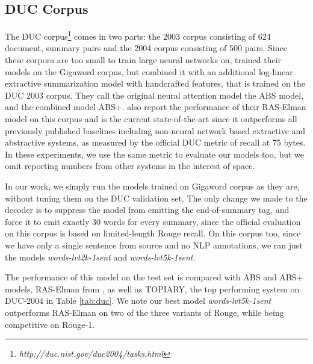\subsection{DUC Corpus}

The DUC corpus\footnote{{\it http://duc.nist.gov/duc2004/tasks.html}} comes in two parts: the 2003 corpus consisting of 624 document, summary pairs and the 2004 corpus consisting of 500 pairs. Since these corpora are too small to train large neural networks on,  trained their models on the Gigaword corpus, but combined it with an additional log-linear extractive summarization model with handcrafted features, that is trained on the DUC 2003 corpus. They call the original neural attention model the ABS model, and the combined model ABS+.  also report the performance of their RAS-Elman model on this corpus and is the current state-of-the-art since it outperforms all previously published baselines including non-neural network based extractive and abstractive systems, as measured by the official DUC metric of recall at 75 bytes. In these experiments, we use the same metric to evaluate our models too, but we omit reporting numbers from other systems in the interest of space.

In our work, we simply run the models trained on Gigaword corpus as they are, without tuning them on the DUC validation set. The only change we made to the decoder is to suppress the model from emitting the end-of-summary tag, and force it to emit exactly 30 words for every summary, since the official evaluation on this corpus is based on limited-length Rouge recall. On this corpus too, since we have only a single sentence from source and no NLP annotations, we ran just the models {\it words-lvt2k-1sent} and {\it words-lvt5k-1sent}.

The performance of this model on the test set is compared with ABS and ABS+ models, RAS-Elman from \cite{chopra}, as well as TOPIARY, the top performing system on DUC-2004 in Table \ref{tab:duc}. We note our best model {\it words-lvt5k-1sent} outperforms RAS-Elman on two of the three variants of Rouge, while being competitive on Rouge-1.

